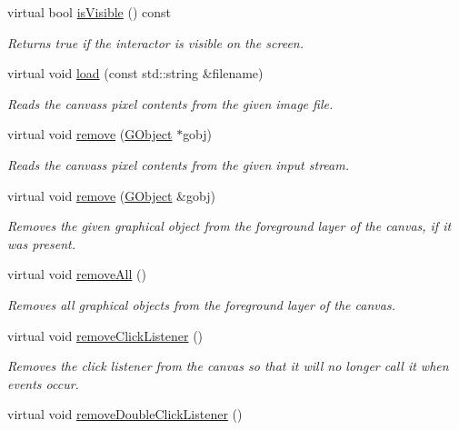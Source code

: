 \begin{DoxyCompactItemize}
virtual bool \mbox{\hyperlink{classGInteractor_a9d8a6cfb13917785c143e74d40e4e2be}{is\+Visible}} () const
\begin{DoxyCompactList}\small\item\em Returns true if the interactor is visible on the screen. \end{DoxyCompactList}\item 
virtual void \mbox{\hyperlink{classGCanvas_a6c21edd9d285c925527e3209fca54b01}{load}} (const std\+::string \&filename)
\begin{DoxyCompactList}\small\item\em Reads the canvas\textquotesingle{}s pixel contents from the given image file. \end{DoxyCompactList}\item 
virtual void \mbox{\hyperlink{classGCanvas_a49dc57a2ce4caa354a5fff6acdde2e7d}{remove}} (\mbox{\hyperlink{classGObject}{G\+Object}} $\ast$gobj)
\begin{DoxyCompactList}\small\item\em Reads the canvas\textquotesingle{}s pixel contents from the given input stream. \end{DoxyCompactList}\item 
virtual void \mbox{\hyperlink{classGCanvas_a0c0ae4d69b584602ff3cba0d9cf330a4}{remove}} (\mbox{\hyperlink{classGObject}{G\+Object}} \&gobj)
\begin{DoxyCompactList}\small\item\em Removes the given graphical object from the foreground layer of the canvas, if it was present. \end{DoxyCompactList}\item 
virtual void \mbox{\hyperlink{classGCanvas_a9b0a5a3ad9972ab0e8eb0b54873aac6b}{remove\+All}} ()
\begin{DoxyCompactList}\small\item\em Removes all graphical objects from the foreground layer of the canvas. \end{DoxyCompactList}\item 
virtual void \mbox{\hyperlink{classGCanvas_ad39d0325cde6b97ebda4b9d7787c633b}{remove\+Click\+Listener}} ()
\begin{DoxyCompactList}\small\item\em Removes the click listener from the canvas so that it will no longer call it when events occur. \end{DoxyCompactList}\item 
virtual void \mbox{\hyperlink{classGCanvas_aa4250907e4cdd77349c04f0cf5cdd3d3}{remove\+Double\+Click\+Listener}} ()

\end{DoxyCompactItemize}
